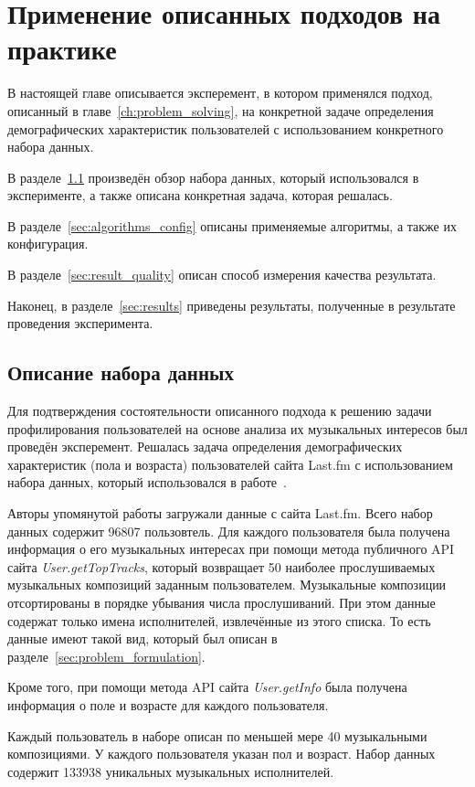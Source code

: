 \chapter{Применение описанных подходов на практике}

В настоящей главе описывается эксперемент, в котором применялся
подход, описанный в главе~\ref{ch:problem_solving}, на
конкретной задаче определения демографических характеристик
пользователей с использованием конкретного набора данных.

В разделе~\ref{sec:dataset} произведён обзор набора данных,
который использовался в эксперименте, а также описана
конкретная задача, которая решалась.

В разделе~\ref{sec:algorithms_config} описаны применяемые
алгоритмы, а также их конфигурация.

В разделе~\ref{sec:result_quality} описан способ измерения
качества результата.

Наконец, в разделе~\ref{sec:results} приведены результаты,
полученные в результате проведения эксперимента.

\section{Описание набора данных}
\label{sec:dataset}

Для подтверждения состоятельности описанного подхода к решению задачи
профилирования пользователей на основе анализа их музыкальных
интересов был проведён эксперемент. Решалась задача определения
демографических характеристик (пола и возраста) пользователей сайта 
Last.fm с использованием набора данных, который использовался в
работе~\cite{wu2014gender}.

Авторы упомянутой работы загружали данные с сайта Last.fm. Всего набор
данных содержит 96807 пользовтель. Для каждого пользователя была
получена информация о его музыкальных интересах при помощи метода
публичного API сайта \textit{User.getTopTracks}, который возвращает
50 наиболее прослушиваемых музыкальных композиций заданным пользователем. 
Музыкальные композиции отсортированы в порядке убывания числа прослушиваний.
При этом данные содержат только имена исполнителей, извлечённые из этого списка.
То есть данные имеют такой вид, который был описан в 
разделе~\ref{sec:problem_formulation}. 

Кроме того, при помощи метода API сайта \textit{User.getInfo}
была получена информация о поле и возрасте для каждого пользователя.

Каждый пользователь в наборе описан по меньшей мере 40
музыкальными композициями. У каждого пользователя указан пол и возраст.
Набор данных содержит 133938 уникальных музыкальных исполнителей.

